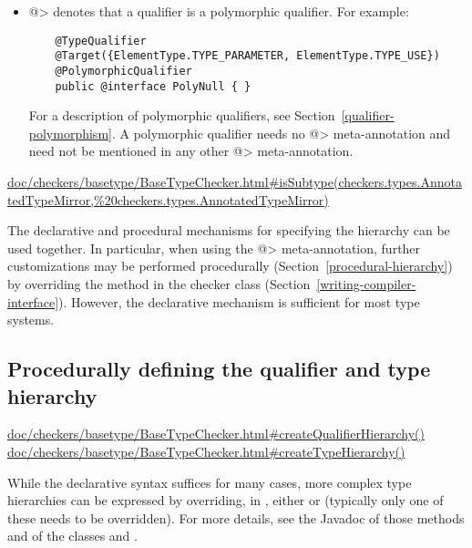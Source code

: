 \begin{itemize}
\item \<@> denotes that a qualifier is a
  polymorphic qualifier.  For example:

  \begin{Verbatim}
    @TypeQualifier
    @Target({ElementType.TYPE_PARAMETER, ElementType.TYPE_USE})
    @PolymorphicQualifier
    public @interface PolyNull { }
  \end{Verbatim}

  For a description of polymorphic qualifiers, see
  Section~\ref{qualifier-polymorphism}.  A polymorphic qualifier needs
  no \<@> meta-annotation and need not be
  mentioned in any other \<@>
  meta-annotation.

\end{itemize}

\urldef{\isSubtypeURL}\url{doc/checkers/basetype/BaseTypeChecker.html#isSubtype(checkers.types.AnnotatedTypeMirror,%20checkers.types.AnnotatedTypeMirror)}

The declarative and procedural mechanisms for specifying the hierarchy can
be used together.  In particular, when using the \<@>
meta-annotation, further customizations may be
performed procedurally (Section~\ref{procedural-hierarchy})
by overriding the  method in the checker class
(Section~\ref{writing-compiler-interface}).
However, the declarative mechanism is sufficient for most type systems.


\subsection{Procedurally defining the qualifier and type hierarchy\label{procedural-hierarchy}}

\urldef{\createQualifierHierarchyURL}\url{doc/checkers/basetype/BaseTypeChecker.html#createQualifierHierarchy()}
\urldef{\createTypeHierarchyURL}\url{doc/checkers/basetype/BaseTypeChecker.html#createTypeHierarchy()}

While the declarative syntax suffices for many cases, more complex
type hierarchies can be expressed by overriding, in ,
either  or  (typically
only one of these needs to be overridden).
For more details, see the Javadoc of those methods and of the classes
 and .

